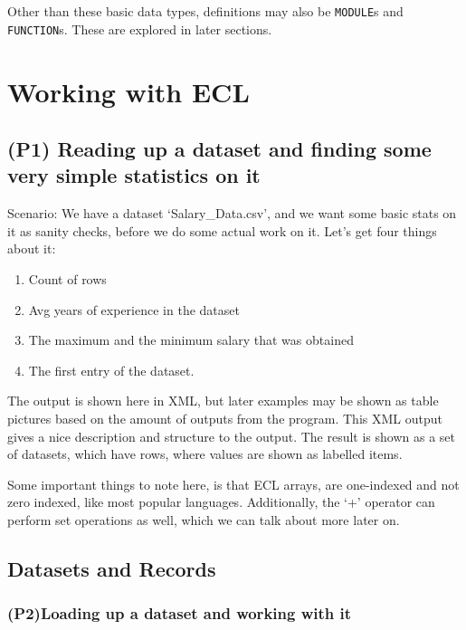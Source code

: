 Other than these basic data types, definitions may also be \lstinline{MODULE}s and \lstinline{FUNCTION}s. These are explored in later sections.

\section{Working with ECL}

\subsection[Simple Statistics on Datasets]{(P1) Reading up a dataset and finding some very simple statistics on it}

Scenario: We have a dataset `Salary\_Data.csv', and we want some basic stats on it as sanity checks, before we do some actual work on it. Let's get four things about it:

\begin{enumerate}
    \item Count of rows
    \item Avg years of experience in the dataset
    \item The maximum and the minimum salary that was obtained
    \item The first entry of the dataset.
\end{enumerate}



\pagebreak
The output is shown here in XML, but later examples may be shown as table pictures based on the amount of outputs from the program.
This XML output gives a nice description and structure to the output. The result is shown as a set of datasets, which have rows, where values are shown as labelled items.

Some important things to note here, is that ECL arrays, are one-indexed and not zero indexed, like most popular languages. 
Additionally, the `+' operator can perform set operations as well, which we can talk about more later on.




\subsection{Datasets and Records}

\subsubsection[Common data operations]{(P2)Loading up a dataset and working with it}

